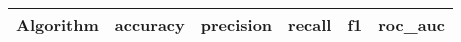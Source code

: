 \begin{tabular}{rrrrrr}
\toprule
Algorithm & accuracy & precision & recall & f1 & roc_auc \\
\midrule
\bottomrule
\end{tabular}
